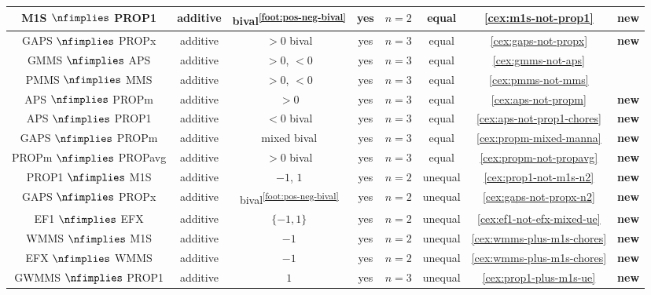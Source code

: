 \begin{table}[!htb]
\begin{tabular}{cccccccc}
\\[\defaultaddspace] M1S $\nfimplies$ PROP1
    & additive & bival\textsuperscript{\ref{foot:pos-neg-bival}}
    & yes & $n=2$ & equal & \cref{cex:m1s-not-prop1} & \textbf{new}
%
\\\midrule GAPS $\nfimplies$ PROPx
    & additive & $> 0$ bival & yes & $n=3$ & equal & \cref{cex:gaps-not-propx} & \textbf{new}
\\[\defaultaddspace] GMMS $\nfimplies$ APS
    & additive & $> 0$, $< 0$ & yes & $n=3$ & equal & \cref{cex:gmms-not-aps} & \cite{babaioff2023fair}
\\[\defaultaddspace] PMMS $\nfimplies$ MMS
    & additive & $> 0$, $< 0$ & yes & $n=3$ & equal & \cref{cex:pmms-not-mms} & \cite{caragiannis2019unreasonable}
\\[\defaultaddspace] APS $\nfimplies$ PROPm
    & additive & $> 0$ & yes & $n=3$ & equal & \cref{cex:aps-not-propm} & \textbf{new}
\\[\defaultaddspace] APS $\nfimplies$ PROP1
    & additive & $< 0$ bival & yes & $n=3$ & equal & \cref{cex:aps-not-prop1-chores} & \textbf{new}
\\[\defaultaddspace] GAPS $\nfimplies$ PROPm
    & additive & mixed bival & yes & $n=3$ & equal & \cref{cex:propm-mixed-manna} & \textbf{new}
\\[\defaultaddspace] PROPm $\nfimplies$ PROPavg
    & additive & $> 0$ bival & yes & $n=3$ & equal & \cref{cex:propm-not-propavg} & \textbf{new}
%
\\\midrule PROP1 $\nfimplies$ M1S
    & additive & $-1$, $1$ & yes & $n=2$ & unequal & \cref{cex:prop1-not-m1s-n2} & \textbf{new}
\\[\defaultaddspace] GAPS $\nfimplies$ PROPx
    & additive & bival\textsuperscript{\ref{foot:pos-neg-bival}}
    & yes & $n=2$ & unequal & \cref{cex:gaps-not-propx-n2} & \textbf{new}
\\[\defaultaddspace] EF1 $\nfimplies$ EFX
    & additive & $\{-1, 1\}$ & yes & $n=2$ & unequal & \cref{cex:ef1-not-efx-mixed-ue} & \textbf{new}
\\[\defaultaddspace] WMMS $\nfimplies$ M1S
    & additive & $-1$ & yes & $n=2$ & unequal & \cref{cex:wmms-plus-m1s-chores} & \textbf{new}
\\[\defaultaddspace] EFX $\nfimplies$ WMMS
    & additive & $-1$ & yes & $n=2$ & unequal & \cref{cex:wmms-plus-m1s-chores} & \textbf{new}
\\[\defaultaddspace] GWMMS $\nfimplies$ PROP1
    & additive & $1$ & yes & $n=3$ & unequal & \cref{cex:prop1-plus-m1s-ue} & \textbf{new}

\end{tabular}
\end{table}
